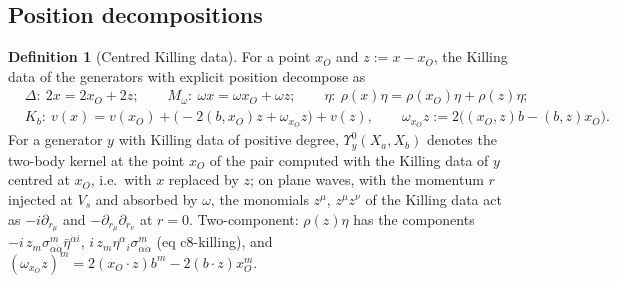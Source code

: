 \documentclass[11pt]{article}
\numberwithin{equation}{section}
\theoremstyle{plain}
\theoremstyle{definition}
\newtheorem{definition}[theorem]{Definition}
\begin{document}
\subsection{Position decompositions}

\begin{definition}[Centred Killing data]
\label{def:op-centred}
For a point $x_O$ and $z:=x-x_O$, the Killing data of the generators with explicit position decompose as
\[
\begin{aligned}
&\Delta:\ 2x=2x_O+2z;\qquad M_\omega:\ \omega x=\omega x_O+\omega z;\qquad \eta:\ \rho(x)\eta=\rho(x_O)\eta+\rho(z)\eta;\\
&K_b:\ v(x)=v(x_O)+\big(-2(b,x_O)z+\omega_{x_O}z\big)+v(z),\qquad \omega_{x_O}z:=2\big((x_O,z)b-(b,z)x_O\big).
\end{aligned}
\]
For a generator $y$ with Killing data of positive degree, $\Upsilon^0_y(X_a,X_b)$ denotes the two-body kernel at the point $x_O$ of the pair computed with the Killing data of $y$ centred at $x_O$, i.e.\ with $x$ replaced by $z$; on plane waves, with the momentum $r$ injected at $V_s$ and absorbed by $\omega$, the monomials $z^\mu$, $z^\mu z^\nu$ of the Killing data act as $-i\partial_{r_\mu}$ and $-\partial_{r_\mu}\partial_{r_\nu}$ at $r=0$. Two-component: $\rho(z)\eta$ has the components $-i\,z_m\sigma^m_{\alpha\dot\alpha}\bar\eta^{\dot\alpha i}$, $i\,z_m\eta^\alpha{}_i\sigma^m_{\alpha\dot\alpha}$ (eq c8-killing), and $(\omega_{x_O}z)^m=2(x_O\cdot z)b^m-2(b\cdot z)x_O^m$.
\end{definition}
\end{document}

